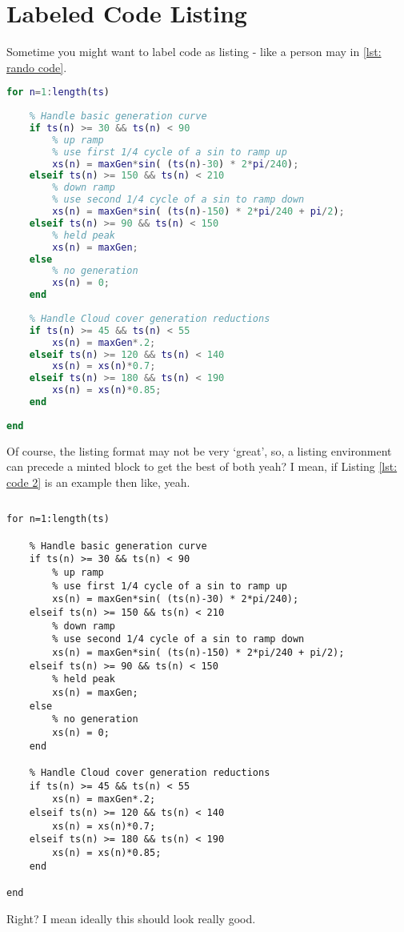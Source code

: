 \section{Labeled Code Listing}
Sometime you might want to label code as listing - like a person may in \ref{lst: rando code}.
\begin{lstlisting}[caption={Some MATLAB code},label={lst: rando code},language=MATLAB]
for n=1:length(ts)
    
    % Handle basic generation curve
    if ts(n) >= 30 && ts(n) < 90
        % up ramp
        % use first 1/4 cycle of a sin to ramp up
        xs(n) = maxGen*sin( (ts(n)-30) * 2*pi/240); 
    elseif ts(n) >= 150 && ts(n) < 210
        % down ramp
        % use second 1/4 cycle of a sin to ramp down
        xs(n) = maxGen*sin( (ts(n)-150) * 2*pi/240 + pi/2);   
    elseif ts(n) >= 90 && ts(n) < 150
        % held peak
        xs(n) = maxGen;
    else
        % no generation
        xs(n) = 0;
    end
    
    % Handle Cloud cover generation reductions
    if ts(n) >= 45 && ts(n) < 55
        xs(n) = maxGen*.2;
    elseif ts(n) >= 120 && ts(n) < 140
        xs(n) = xs(n)*0.7;
    elseif ts(n) >= 180 && ts(n) < 190
        xs(n) = xs(n)*0.85;
    end
    
end
\end{lstlisting}


\pagebreak
Of course, the listing format may not be very `great', so, a listing environment can precede a minted block to get the best of both yeah?
I mean, if Listing \ref{lst: code 2} is an example then like, yeah.

\begin{lstlisting}[caption={Empty listing before a minted block},label={lst: code 2},language=MATLAB]
\end{lstlisting}\vspace{-2 em}
\begin{verbatim}
for n=1:length(ts)
    
    % Handle basic generation curve
    if ts(n) >= 30 && ts(n) < 90
        % up ramp
        % use first 1/4 cycle of a sin to ramp up
        xs(n) = maxGen*sin( (ts(n)-30) * 2*pi/240); 
    elseif ts(n) >= 150 && ts(n) < 210
        % down ramp
        % use second 1/4 cycle of a sin to ramp down
        xs(n) = maxGen*sin( (ts(n)-150) * 2*pi/240 + pi/2);   
    elseif ts(n) >= 90 && ts(n) < 150
        % held peak
        xs(n) = maxGen;
    else
        % no generation
        xs(n) = 0;
    end
    
    % Handle Cloud cover generation reductions
    if ts(n) >= 45 && ts(n) < 55
        xs(n) = maxGen*.2;
    elseif ts(n) >= 120 && ts(n) < 140
        xs(n) = xs(n)*0.7;
    elseif ts(n) >= 180 && ts(n) < 190
        xs(n) = xs(n)*0.85;
    end
    
end
\end{verbatim}

Right? I mean ideally this should look really good.


